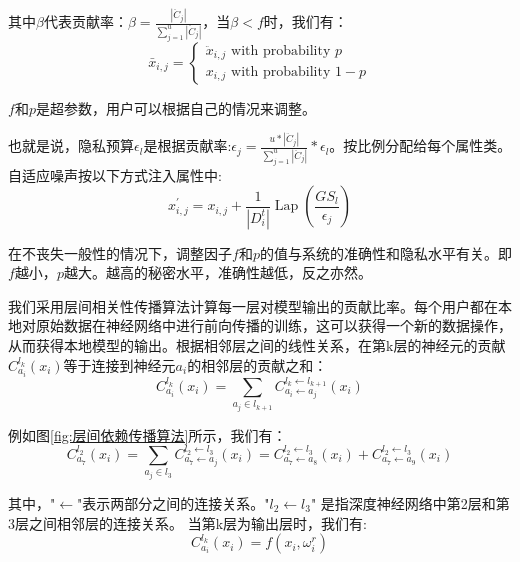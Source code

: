 其中$\beta$代表贡献率：$\beta=\frac{\left|\ddot{C}_{j}\right|}{\sum_{j=1}^{u}\left|\ddot{C}_{j}\right|}$，当$\beta<f$时，我们有：
\begin{equation}\label{eq:神经网络加噪2}
\bar{x}_{i, j}=\left\{\begin{array}{l}
\ddot{x}_{i, j} \text { with probability } p \\
x_{i, j} \text { with probability } 1-p
\end{array}\right.
\end{equation}


$f$和$p$是超参数，用户可以根据自己的情况来调整。

也就是说，隐私预算$\epsilon_{l}$是根据贡献率:$\epsilon_{j}=\frac{u *\left|\ddot{C}_{j}\right|}{\sum_{j=1}^{u}\left|\ddot{C}_{j}\right|} * \epsilon_{l}$。按比例分配给每个属性类。自适应噪声按以下方式注入属性中:
\begin{equation}\label{eq:神经网络加噪3}
x_{i, j}^{\prime}=x_{i, j}+\frac{1}{\left|D_{i}^{t}\right|} \operatorname{Lap}\left(\frac{G S_{l}}{\epsilon_{j}}\right)
\end{equation}

在不丧失一般性的情况下，调整因子$f$和$p$的值与系统的准确性和隐私水平有关。即$f$越小，$p$越大。越高的秘密水平，准确性越低，反之亦然。

我们采用层间相关性传播算法计算每一层对模型输出的贡献比率。每个用户都在本地对原始数据在神经网络中进行前向传播的训练，这可以获得一个新的数据操作，从而获得本地模型的输出。根据相邻层之间的线性关系，在第k层的神经元的贡献$C_{a_{i}}^{l_{k}}\left(x_{i}\right)$等于连接到神经元$a_{i}$的相邻层的贡献之和：
\begin{equation}\label{eq:神经网络加噪4}
C_{a_{i}}^{l_{k}}\left(x_{i}\right)=\sum_{a_{j} \in l_{k+1}} C_{a_{i} \leftarrow a_{j}}^{l_{k} \leftarrow l_{k+1}}\left(x_{i}\right)
\end{equation}

例如图\ref{fig:层间依赖传播算法}所示，我们有：
\begin{equation}
C_{a_{7}}^{l_{2}}\left(x_{i}\right)=\sum_{a_{j} \in l_{3}} C_{a_{7} \leftarrow a_{j}}^{l_{2} \leftarrow l_{3}}\left(x_{i}\right)=C_{a_{7} \leftarrow a_{8}}^{l_{2} \leftarrow l_{3}}\left(x_{i}\right)+C_{a_{7} \leftarrow a_{9}}^{l_{2} \leftarrow l_{3}}\left(x_{i}\right)
\end{equation}

其中，"$\leftarrow$"表示两部分之间的连接关系。"$l_{2} \leftarrow l_{3}$" 是指深度神经网络中第2层和第3层之间相邻层的连接关系。
当第k层为输出层时，我们有:
\begin{equation}
C_{a_{i}}^{l_{k}}\left(x_{i}\right)=f\left(x_{i}, \omega_{i}^{r}\right)
\end{equation}


